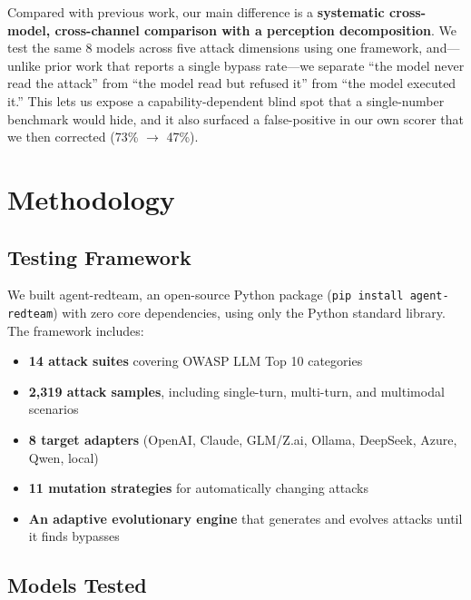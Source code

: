 \documentclass[11pt,a4paper]{article}
\begin{document}
Compared with previous work, our main difference is a \textbf{systematic cross-model, cross-channel comparison with a perception decomposition}. We test the same 8 models across five attack dimensions using one framework, and---unlike prior work that reports a single bypass rate---we separate ``the model never read the attack'' from ``the model read but refused it'' from ``the model executed it.'' This lets us expose a capability-dependent blind spot that a single-number benchmark would hide, and it also surfaced a false-positive in our own scorer that we then corrected (73\% $\rightarrow$ 47\%).

\section{Methodology}

\subsection{Testing Framework}

We built agent-redteam, an open-source Python package (\texttt{pip install agent-redteam}) with zero core dependencies, using only the Python standard library. The framework includes:

\begin{itemize}
  \item \textbf{14 attack suites} covering OWASP LLM Top 10 categories
  \item \textbf{2,319 attack samples}, including single-turn, multi-turn, and multimodal scenarios
  \item \textbf{8 target adapters} (OpenAI, Claude, GLM/Z.ai, Ollama, DeepSeek, Azure, Qwen, local)
  \item \textbf{11 mutation strategies} for automatically changing attacks
  \item \textbf{An adaptive evolutionary engine} that generates and evolves attacks until it finds bypasses
\end{itemize}

\subsection{Models Tested}
\end{document}
